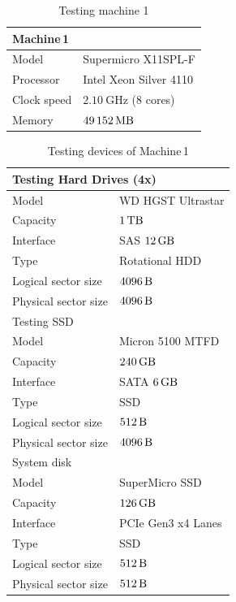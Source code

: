 \documentclass[
  color, %
  table, %
  lof,   %
  lot,   %
]{fithesis3}
\begin{document}
\begin{table}
\centering
\begin{tabular}{|l|l|}
\hline
   \multicolumn{2}{|l|}{Machine\,1} \\ \hline %
    Model & Supermicro X11SPL-F\\
    \hline
    Processor & Intel Xeon Silver 4110  \\
    \hline
    Clock speed & $\SI{2.10}{\giga\hertz}$ (8 cores) \\
    \hline
    Memory & $\SI{49152}{\mega\byte}$ \\
    \hline
\end{tabular}
\caption{Testing machine 1}
\end{table}


\begin{table}
\centering
\begin{tabular}{|l|l|}
\hline
   \multicolumn{2}{|l|}{Testing Hard Drives (4x)} \\ \hline %
    Model & WD HGST Ultrastar\\
    \hline
    Capacity & $\SI{1}{\tera\byte}$  \\
    \hline
    Interface & SAS $\SI{12}{\giga\byte}$  \\
    \hline
    Type & Rotational HDD \\
    \hline    
    Logical sector size & $\SI{4096}{\byte}$ \\    
    \hline    
    Physical sector size & $\SI{4096}{\byte}$ \\
    \hline
    \hline
    \multicolumn{2}{|l|}{Testing SSD } \\ \hline %
     Model & Micron 5100 MTFD \\
    \hline
     Capacity & $\SI{240}{\giga\byte}$  \\
    \hline
    Interface & SATA $\SI{6}{\giga\byte}$  \\
    \hline
    Type & SSD \\
    \hline    
    Logical sector size & $\SI{512}{\byte}$ \\    
    \hline    
     Physical sector size & $\SI{4096}{\byte}$ \\
    \hline
    \hline
    \multicolumn{2}{|l|}{System disk} \\ \hline %
    Model & SuperMicro SSD  \\
    \hline
    Capacity & $\SI{126}{\giga\byte}$  \\
    \hline
    Interface & PCIe Gen3 x4 Lanes  \\
    \hline
    Type & SSD \\
    \hline    
   Logical sector size & $\SI{512}{\byte}$ \\    
    \hline    
    Physical sector size & $\SI{512}{\byte}$ \\
    \hline   
\end{tabular}
\caption{Testing devices of Machine\,1}
\end{table}
\end{document}
